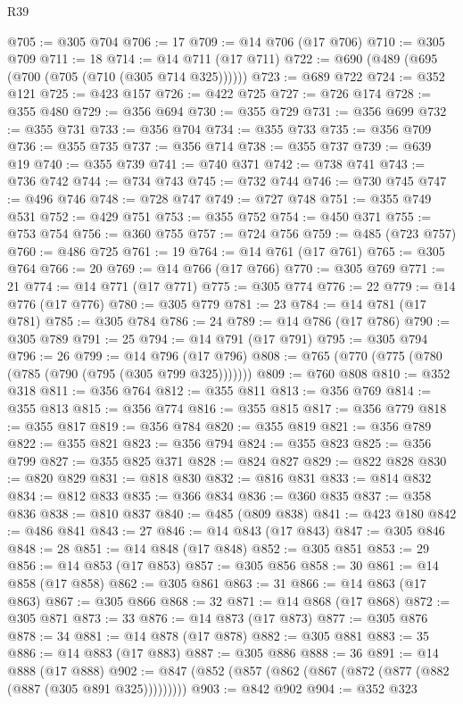 \begin{lexlean}{R39}
\begin{coremodule}
@705 := @305 @704
@706 := 17
@709 := @14 @706 (@17 @706)
@710 := @305 @709
@711 := 18
@714 := @14 @711 (@17 @711)
@722 := @690 (@489 (@695 (@700 (@705 (@710 (@305 @714 @325))))))
@723 := @689 @722
@724 := @352 @121
@725 := @423 @157
@726 := @422 @725
@727 := @726 @174
@728 := @355 @480
@729 := @356 @694
@730 := @355 @729
@731 := @356 @699
@732 := @355 @731
@733 := @356 @704
@734 := @355 @733
@735 := @356 @709
@736 := @355 @735
@737 := @356 @714
@738 := @355 @737
@739 := @639 @19
@740 := @355 @739
@741 := @740 @371
@742 := @738 @741
@743 := @736 @742
@744 := @734 @743
@745 := @732 @744
@746 := @730 @745
@747 := @496 @746
@748 := @728 @747
@749 := @727 @748
@751 := @355 @749 @531
@752 := @429 @751
@753 := @355 @752
@754 := @450 @371
@755 := @753 @754
@756 := @360 @755
@757 := @724 @756
@759 := @485 (@723 @757)
@760 := @486 @725
@761 := 19
@764 := @14 @761 (@17 @761)
@765 := @305 @764
@766 := 20
@769 := @14 @766 (@17 @766)
@770 := @305 @769
@771 := 21
@774 := @14 @771 (@17 @771)
@775 := @305 @774
@776 := 22
@779 := @14 @776 (@17 @776)
@780 := @305 @779
@781 := 23
@784 := @14 @781 (@17 @781)
@785 := @305 @784
@786 := 24
@789 := @14 @786 (@17 @786)
@790 := @305 @789
@791 := 25
@794 := @14 @791 (@17 @791)
@795 := @305 @794
@796 := 26
@799 := @14 @796 (@17 @796)
@808 := @765 (@770 (@775 (@780 (@785 (@790 (@795 (@305 @799 @325)))))))
@809 := @760 @808
@810 := @352 @318
@811 := @356 @764
@812 := @355 @811
@813 := @356 @769
@814 := @355 @813
@815 := @356 @774
@816 := @355 @815
@817 := @356 @779
@818 := @355 @817
@819 := @356 @784
@820 := @355 @819
@821 := @356 @789
@822 := @355 @821
@823 := @356 @794
@824 := @355 @823
@825 := @356 @799
@827 := @355 @825 @371
@828 := @824 @827
@829 := @822 @828
@830 := @820 @829
@831 := @818 @830
@832 := @816 @831
@833 := @814 @832
@834 := @812 @833
@835 := @366 @834
@836 := @360 @835
@837 := @358 @836
@838 := @810 @837
@840 := @485 (@809 @838)
@841 := @423 @180
@842 := @486 @841
@843 := 27
@846 := @14 @843 (@17 @843)
@847 := @305 @846
@848 := 28
@851 := @14 @848 (@17 @848)
@852 := @305 @851
@853 := 29
@856 := @14 @853 (@17 @853)
@857 := @305 @856
@858 := 30
@861 := @14 @858 (@17 @858)
@862 := @305 @861
@863 := 31
@866 := @14 @863 (@17 @863)
@867 := @305 @866
@868 := 32
@871 := @14 @868 (@17 @868)
@872 := @305 @871
@873 := 33
@876 := @14 @873 (@17 @873)
@877 := @305 @876
@878 := 34
@881 := @14 @878 (@17 @878)
@882 := @305 @881
@883 := 35
@886 := @14 @883 (@17 @883)
@887 := @305 @886
@888 := 36
@891 := @14 @888 (@17 @888)
@902 := @847 (@852 (@857 (@862 (@867 (@872 (@877 (@882 (@887 (@305 @891 @325)))))))))
@903 := @842 @902
@904 := @352 @323

\end{coremodule}
\end{lexlean}
